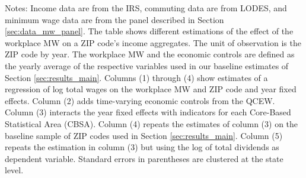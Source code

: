 \begin{table}[hbt!]
    \begin{minipage}{.95\textwidth} \footnotesize
        \vspace{2mm}
        Notes: 
        Income data are from the IRS, commuting data are from LODES, and minimum wage 
        data are from the panel described in Section \ref{sec:data_mw_panel}.
        The table shows different estimations of the effect of the workplace MW
        on a ZIP code's income aggregates.
        The unit of observation is the ZIP code by year.
        The workplace MW and the economic controls are defined as the yearly 
        average of the respective variables used in our baseline estimates of 
        Section \ref{sec:results_main}.
        Columns (1) through (4) show estimates of a regression of log total wages
        on the workplace MW and ZIP code and year fixed effects.
        Column (2) adds time-varying economic controls from the QCEW.
        Column (3) interacts the year fixed effects with indicators for each
        Core-Based Statistical Area (CBSA).
        Column (4) repeats the estimates of column (3) on the baseline sample
        of ZIP codes used in Section \ref{sec:results_main}.
        Column (5) repeats the estimation in column (3) but using the log of 
        total dividends as dependent variable.
        Standard errors in parentheses are clustered at the state level.
    \end{minipage}
\end{table}

